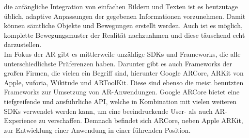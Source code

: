 die anfängliche Integration von einfachen Bildern und Texten ist es heutzutage üblich, adaptive Anpassungen der gegebenen Informationen 
vorzunehmen. \cite{standDerAR.2020} Damit können sämtliche Objekte und Bewegungen erstellt werden. Auch ist es möglich, komplette Bewegungsmuster der Realität 
nachzuahmen und diese täuschend echt darzustellen.
\\ 
\linebreak
Im Fokus der \acl{AR} gibt es mittlerweile unzählige SDKs und Frameworks, die alle unterschiedlichste Präferenzen haben. Darunter gibt es 
auch Frameworks der großen Firmen, die vielen ein Begriff sind, hierunter Google ARCore, ARKit von Apple, vuforia, Wikitude und ARToolKit. 
Diese sind ebenso die meist benutzten Frameworks zur Umsetzung von \acs{AR}-Anwendungen. Google ARCore bietet eine tiefgreifende und ausführliche 
\ac{API}, welche in Kombination mit vielen weiteren SDKs verwendet werden kann, um eine beeindruckende User- als auch \acs{AR}-Experience zu verschaffen. 
Demnach befindet sich ARCore, neben Apple ARKit, zur Entwicklung einer Anwendung in einer führenden Position. 
